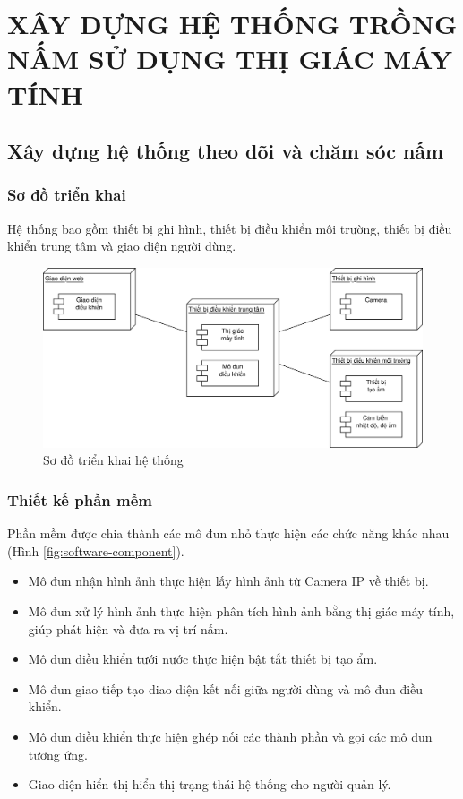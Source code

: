\chapter{XÂY DỰNG HỆ THỐNG TRỒNG NẤM SỬ DỤNG THỊ GIÁC MÁY TÍNH}
\section{Xây dựng hệ thống theo dõi và chăm sóc nấm}
\subsection{Sơ đồ triển khai}

Hệ thống bao gồm thiết bị ghi hình, thiết bị điều khiển môi trường, thiết bị điều khiển trung tâm và giao diện người dùng.

\begin{figure}[h]
    \centering
    \includegraphics[width=0.75\linewidth]{images/deploy.png}
    \caption{Sơ đồ triển khai hệ thống}
    \label{fig:deploy}
\end{figure}

\subsection{Thiết kế phần mềm}

Phần mềm được chia thành các mô đun nhỏ thực hiện các chức năng khác nhau (Hình \ref{fig:software-component}).

\begin{itemize}
    \item Mô đun nhận hình ảnh thực hiện lấy hình ảnh từ Camera IP về thiết bị.
    \item Mô đun xử lý hình ảnh thực hiện phân tích hình ảnh bằng thị giác máy tính, giúp phát hiện và đưa ra vị trí nấm.
    \item Mô đun điều khiển tưới nước thực hiện bật tắt thiết bị tạo ẩm.
    \item Mô đun giao tiếp tạo diao diện kết nối giữa người dùng và mô đun điều khiển.
    \item Mô đun điều khiển thực hiện ghép nối các thành phần và gọi các mô đun tương ứng.
    \item Giao diện hiển thị hiển thị trạng thái hệ thống cho người quản lý.
\end{itemize}

